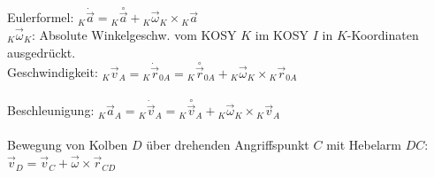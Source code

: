 \documentclass[fs, footer]{latex4ei}
\begin{document}
\begin{multicols}{4}
Eulerformel: ${}_K \dot {\vec a} = {}_K \overset{\circ}{\vec a} + {}_K \vec \omega_K \times {}_K \vec a$\\
${}_K \vec \omega_K$: Absolute Winkelgeschw. vom KOSY $K$ im KOSY $I$ in $K$-Koordinaten ausgedrückt.\\
Geschwindigkeit:
${}_K \vec v_A = {}_K \dot {\vec r}_{0A} = {}_K \overset{\circ}{\vec r}_{0A} + {}_K \vec \omega_K \times {}_K \vec r_{0A}$\\
\\
Beschleunigung:
${}_K \vec a_A = {}_K \dot {\vec v}_{A} = {}_K \overset{\circ}{\vec v}_{A} + {}_K \vec \omega_K \times {}_K \vec v_{A}$\\
\\
Bewegung von Kolben $D$ über drehenden Angriffspunkt $C$ mit Hebelarm $DC$:\\
$\vec v_D = \vec v_{C} + \vec \omega \times \vec r_{CD}$\\

























\end{multicols}
\end{document}
